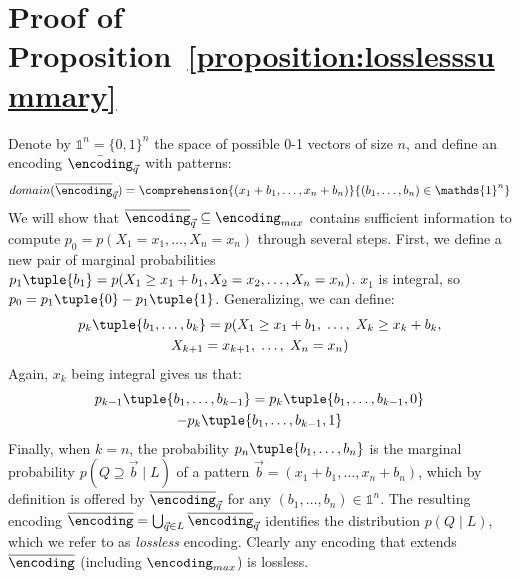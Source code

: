 \section{Proof of Proposition~\ref{proposition:losslesssummary}}
\label{appendix:losslesssummary}
Denote by $\mathds{1}^n = \{0,1\}^n$ the space of possible 0-1 vectors of size $n$, and define an encoding $\bar \encoding_{\vec{q}}$ with patterns:
$$domain(\overline{\encoding}_{\vec{q}})=\comprehension{(x_1+b_1,\ldots,x_n+b_n)}{(b_1,\ldots,b_n)\in\mathds{1}^n}$$
We will show that $\overline{\encoding}_{\vec{q}}\subseteq \encoding_{max}$ contains sufficient information to compute $p_0 = p(X_1=x_1,\ldots,X_n=x_n)$ through several steps.
First, we define a new pair of marginal probabilities $p_1\tuple{b_1} = p(X_1 \geq x_1 + b_1,X_2=x_2,\ldots,X_n=x_n)$.
$x_1$ is integral, so $p_0 = p_1\tuple{0} - p_1\tuple{1}$.
Generalizing, we can define:
\begin{multline*}
p_k\tuple{b_1, \ldots, b_k} = p(X_1 \geq x_1 + b_1,\; \ldots,\; X_k \geq x_k + b_k, \\
  X_{k+1} = x_{k+1},\; \ldots,\; X_n=x_n)
\end{multline*}
Again, $x_k$ being integral gives us that:
\begin{multline*}
p_{k-1}\tuple{b_1, \ldots, b_{k-1}} = p_{k}\tuple{b_1, \ldots, b_{k-1}, 0} \\
  -p_{k}\tuple{b_1, \ldots, b_{k-1}, 1}
\end{multline*}
Finally, when $k = n$, the probability $p_n\tuple{b_1, \ldots, b_n}$ is the marginal probability $p(Q\supseteq\vec{b}\;|\;L)$ of a pattern $\vec{b}=(x_1+b_1, \ldots, x_n+b_n)$, which by definition is offered by $\overline{\encoding}_{\vec{q}}$ for any $(b_1, \ldots, b_n) \in \mathds{1}^n$.
The resulting encoding $\overline{\encoding}=\bigcup_{\vec{q}\in L}\overline{\encoding}_{\vec{q}}$ identifies the distribution $p(Q\;|\;L)$, which we refer to as \emph{lossless} encoding. Clearly any encoding that extends $\overline{\encoding}$ (including $\encoding_{max}$) is lossless.

